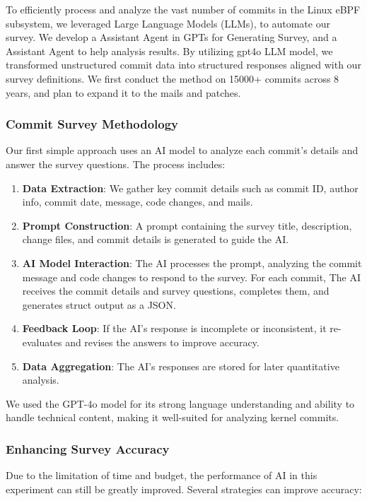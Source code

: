 To efficiently process and analyze the vast number of commits in the Linux eBPF subsystem, we leveraged Large Language Models (LLMs), to automate our survey. We develop a Assistant Agent in GPTs\cite{gpts} for Generating Survey, and a Assistant Agent to help analysis results. By utilizing gpt4o\cite{gpt4o} LLM model, we transformed unstructured commit data into structured responses aligned with our survey definitions. We first conduct the method on 15000+ commits across 8 years, and plan to expand it to the mails and patches.

\subsubsection{Commit Survey Methodology}

Our first simple approach uses an AI model to analyze each commit's details and answer the survey questions. The process includes:

\begin{enumerate} 
\item \textbf{Data Extraction}: We gather key commit details such as commit ID, author info, commit date, message, code changes, and mails. 
\item \textbf{Prompt Construction}: A prompt containing the survey title, description, change files, and commit details is generated to guide the AI.
\item \textbf{AI Model Interaction}: The AI processes the prompt, analyzing the commit message and code changes to respond to the survey. For each commit, The AI receives the commit details and survey questions, completes them, and generates struct output as a JSON.
\item \textbf{Feedback Loop}: If the AI's response is incomplete or inconsistent, it re-evaluates and revises the answers to improve accuracy.
\item \textbf{Data Aggregation}: The AI’s responses are stored for later quantitative analysis. 
\end{enumerate}

We used the GPT-4o model for its strong language understanding and ability to handle technical content, making it well-suited for analyzing kernel commits.

\subsubsection{Enhancing Survey Accuracy}

Due to the limitation of time and budget, the performance of AI in this experiment can still be greatly improved. Several strategies can improve accuracy:

